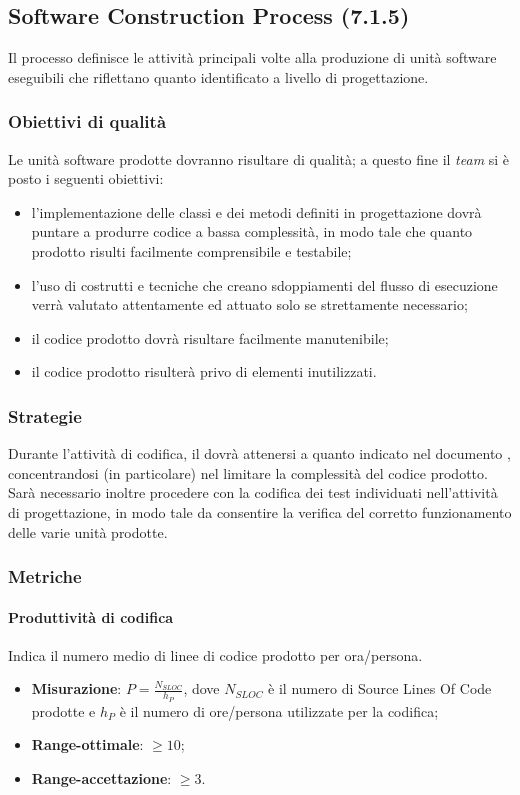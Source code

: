 \subsection{Software Construction Process (7.1.5)}
Il processo definisce le attività principali volte alla produzione di unità software eseguibili che riflettano quanto identificato a livello di progettazione.
\subsubsection{Obiettivi di qualità}
Le unità software prodotte dovranno risultare di qualità; a questo fine il \textit{team} si è posto i seguenti obiettivi:
\begin{itemize}
\item l'implementazione delle classi e dei metodi definiti in progettazione dovrà puntare a produrre codice a bassa complessità, in modo tale che quanto prodotto risulti facilmente comprensibile e testabile;
\item l'uso di costrutti e tecniche che creano sdoppiamenti del flusso di esecuzione verrà valutato attentamente ed attuato solo se strettamente necessario;
\item il codice prodotto dovrà risultare facilmente manutenibile;
\item il codice prodotto risulterà privo di elementi inutilizzati.
\end{itemize}
\subsubsection{Strategie}
Durante l'attività di codifica, il \textit{\Progr} dovrà attenersi a quanto indicato nel documento \textit{\DDP}, concentrandosi (in particolare) nel limitare la complessità del codice prodotto. Sarà necessario inoltre procedere con la codifica dei test individuati nell'attività di progettazione, in modo tale da consentire la verifica del corretto funzionamento delle varie unità prodotte.
\subsubsection{Metriche}
\paragraph{Produttività di codifica}
Indica il numero medio di linee di codice prodotto per ora/persona.
\begin{itemize}
\item \textbf{Misurazione}: $P=\frac{N_{SLOC}}{h_{P}}$, dove $N_{SLOC}$ è il numero di Source Lines Of Code prodotte e $h_{P}$ è il numero di ore/persona utilizzate per la codifica;
\item \textbf{Range-ottimale}: $\geq 10$;
\item \textbf{Range-accettazione}: $\geq 3$.
\end{itemize}
